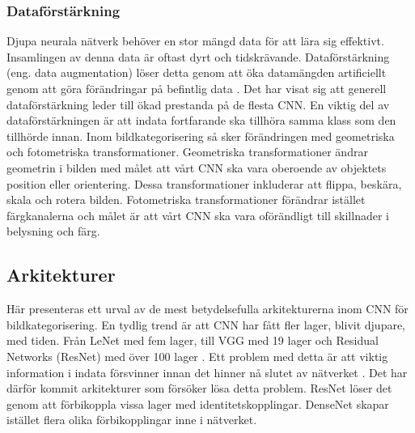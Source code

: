 \documentclass[]{kththesis}
\begin{document}
\subsubsection{Dataförstärkning}
Djupa neurala nätverk behöver en stor mängd data för att lära sig effektivt. Insamlingen av denna data är oftast dyrt och tidskrävande. Dataförstärkning (eng. data augmentation) löser detta genom att öka datamängden artificiellt genom att göra förändringar på befintlig data \parencite{taylor2017improving}. Det har visat sig att generell dataförstärkning leder till ökad prestanda på de flesta CNN. En viktig del av dataförstärkningen är att indata fortfarande ska tillhöra samma klass som den tillhörde innan. Inom bildkategorisering så sker förändringen med geometriska och fotometriska transformationer. Geometriska transformationer ändrar geometrin i bilden med målet att vårt CNN ska vara oberoende av objektets position eller orientering. Dessa transformationer inkluderar att flippa, beskära, skala och rotera bilden. Fotometriska transformationer förändrar istället färgkanalerna och målet är att vårt CNN ska vara oförändligt till skillnader i belysning och färg. 

\subsection{Arkitekturer}
Här presenteras ett urval av de mest betydelsefulla arkitekturerna inom CNN för bildkategorisering. En tydlig trend är att CNN har fått fler lager, blivit djupare, med tiden. Från LeNet \parencite{lecun1998gradient} med fem lager, till VGG med 19 lager \parencite{simonyan2014very} och Residual Networks (ResNet) med över 100 lager \parencite{he2016deep}. Ett problem med detta är att viktig information i indata försvinner innan det hinner nå slutet av nätverket \parencite{huang2017densely}. Det har därför kommit arkitekturer som försöker lösa detta problem. ResNet löser det genom att förbikoppla vissa lager med identitetskopplingar. DenseNet skapar istället flera olika förbikopplingar inne i nätverket.
\end{document}
